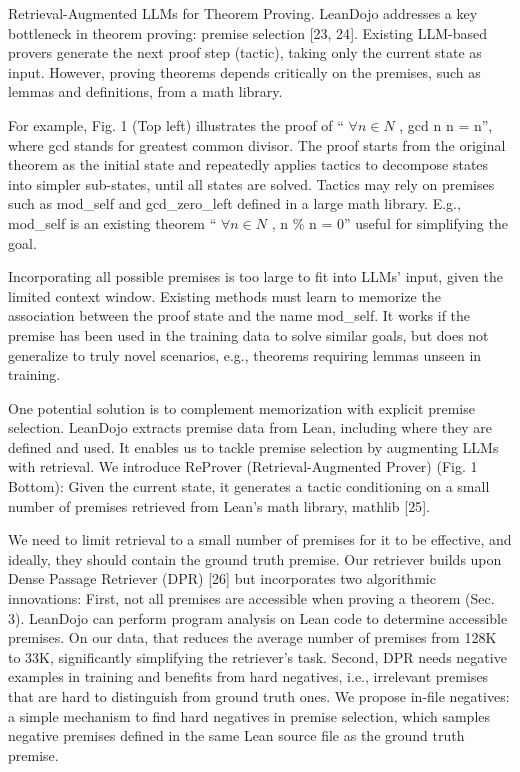 \documentclass[
]{article}
\begin{document}
Retrieval-Augmented LLMs for Theorem Proving. LeanDojo addresses a key
bottleneck in theorem proving: premise selection {[}23, 24{]}. Existing
LLM-based provers generate the next proof step (tactic), taking only the
current state as input. However, proving theorems depends critically on
the premises, such as lemmas and definitions, from a math library.

For example, Fig. 1 (Top left) illustrates the proof of ``
\(\forall n \in N\) , gcd n n = n'', where gcd stands for greatest
common divisor. The proof starts from the original theorem as the
initial state and repeatedly applies tactics to decompose states into
simpler sub-states, until all states are solved. Tactics may rely on
premises such as mod\_self and gcd\_zero\_left defined in a large math
library. E.g., mod\_self is an existing theorem `` \(\forall n \in N\) ,
n \% n = 0'' useful for simplifying the goal.

Incorporating all possible premises is too large to fit into LLMs'
input, given the limited context window. Existing methods must learn to
memorize the association between the proof state and the name mod\_self.
It works if the premise has been used in the training data to solve
similar goals, but does not generalize to truly novel scenarios, e.g.,
theorems requiring lemmas unseen in training.

One potential solution is to complement memorization with explicit
premise selection. LeanDojo extracts premise data from Lean, including
where they are defined and used. It enables us to tackle premise
selection by augmenting LLMs with retrieval. We introduce ReProver
(Retrieval-Augmented Prover) (Fig. 1 Bottom): Given the current state,
it generates a tactic conditioning on a small number of premises
retrieved from Lean's math library, mathlib {[}25{]}.

We need to limit retrieval to a small number of premises for it to be
effective, and ideally, they should contain the ground truth premise.
Our retriever builds upon Dense Passage Retriever (DPR) {[}26{]} but
incorporates two algorithmic innovations: First, not all premises are
accessible when proving a theorem (Sec. 3). LeanDojo can perform program
analysis on Lean code to determine accessible premises. On our data,
that reduces the average number of premises from 128K to 33K,
significantly simplifying the retriever's task. Second, DPR needs
negative examples in training and benefits from hard negatives, i.e.,
irrelevant premises that are hard to distinguish from ground truth ones.
We propose in-file negatives: a simple mechanism to find hard negatives
in premise selection, which samples negative premises defined in the
same Lean source file as the ground truth premise.
\end{document}
